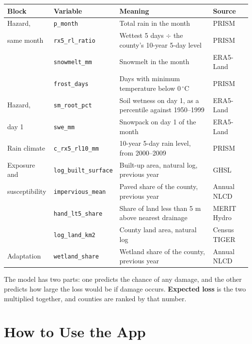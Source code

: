 \documentclass[11pt]{article}
\newcommand{\col}[1]{\texttt{#1}}
\begin{document}
\begin{table}[H]
\centering
\small
\begin{tabularx}{\textwidth}{llYl}
\toprule
\textbf{Block} & \textbf{Variable} & \textbf{Meaning} & \textbf{Source} \\
\midrule
Hazard, & \col{p\_month} & Total rain in the month & PRISM \\
same month & \col{rx5\_rl\_ratio} & Wettest 5 days $\div$ the county's 10-year 5-day level & PRISM \\
 & \col{snowmelt\_mm} & Snowmelt in the month & ERA5-Land \\
 & \col{frost\_days} & Days with minimum temperature below 0\,$^\circ$C & PRISM \\
\midrule
Hazard, & \col{sm\_root\_pct} & Soil wetness on day 1, as a percentile against 1950--1999 & ERA5-Land \\
day 1 & \col{swe\_mm} & Snowpack on day 1 of the month & ERA5-Land \\
\midrule
Rain climate & \col{c\_rx5\_rl10\_mm} & 10-year 5-day rain level, from 2000--2009 & PRISM \\
\midrule
Exposure and & \col{log\_built\_surface} & Built-up area, natural log, previous year & GHSL \\
susceptibility & \col{impervious\_mean} & Paved share of the county, previous year & Annual NLCD \\
 & \col{hand\_lt5\_share} & Share of land less than 5 m above nearest drainage & MERIT Hydro \\
 & \col{log\_land\_km2} & County land area, natural log & Census TIGER \\
\midrule
Adaptation & \col{wetland\_share} & Wetland share of the county, previous year & Annual NLCD \\
\bottomrule
\end{tabularx}
\end{table}

The model has two parts: one predicts the chance of any damage, and the other predicts how large
the loss would be if damage occurs. \textbf{Expected loss} is the two multiplied together, and
counties are ranked by that number.

\section{How to Use the App}
\end{document}
